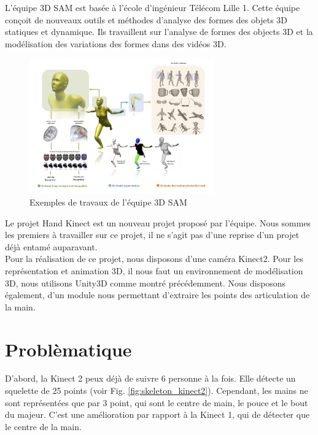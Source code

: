 L'équipe 3D SAM est basée à l'école d'ingénieur Télécom Lille 1. 
Cette équipe conçoit de nouveaux outils et méthodes d'analyse des 
formes des objets 3D statiques et dynamique. Ils travaillent sur 
l'analyse de formes des objects 3D et la modélisation des variations 
des formes dans des vidéos 3D.

\begin{figure}[H]
  \begin{center}
    \includegraphics[width=300px]{images/accueil-illus.jpg}
    \caption{Exemples de travaux de l'équipe 3D SAM}
  \end{center}
\end{figure}

Le projet \og Hand Kinect \fg est un nouveau projet proposé par 
l'équipe. Nous sommes les premiers à travailler sur ce projet, il 
ne s'agit pas d'une reprise d'un projet déjà entamé auparavant.\\

Pour la réalisation de ce projet, nous disposons d'une caméra Kinect2. 
Pour les représentation et animation 3D, il nous faut un environnement 
de modélisation 3D, nous utilisons Unity3D comme montré précédemment. 
Nous disposons également, d'un module nous permettant d'extraire les 
points des articulation de la main.

\section{Problèmatique}
D'abord, la Kinect 2 peux déjà de suivre 6 personne à la fois. Elle 
détecte un squelette de 25 points (voir Fig. 
\ref{fig:skeleton_kinect2}). Cependant, les mains ne sont représentées 
que par 3 point, qui sont le centre de main, le pouce et le bout du 
majeur. C'est une amélioration par rapport à la Kinect 1, qui de 
détecter que le centre de la main.\\

